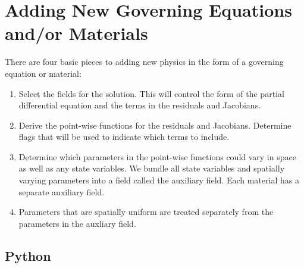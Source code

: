 \section{Adding New Governing Equations and/or Materials}

There are four basic pieces to adding new physics in the form of a
governing equation or material:
\begin{enumerate}
\item Select the fields for the solution. This will control the form
  of the partial differential equation and the terms in the residuals
  and Jacobians.
\item Derive the point-wise functions for the residuals and
  Jacobians. Determine flags that will be used to indicate which terms
  to include.
\item Determine which parameters in the point-wise functions could
  vary in space as well as any state variables. We bundle all state variables
  and spatially varying parameters into a field called the auxiliary
  field. Each material has a separate auxiliary field.
\item Parameters that are spatially uniform are treated separately
  from the parameters in the auxliary field.
\end{enumerate}

\subsection{Python}

